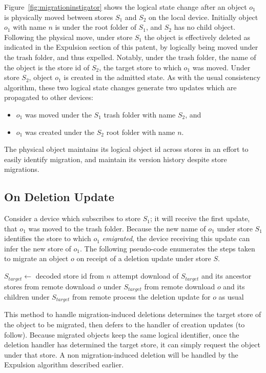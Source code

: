 Figure~\ref{fig:migrationinstigator} shows the logical state change after an
object $o_1$ is physically moved between stores $S_1$ and $S_2$ on the local
device. Initially object $o_1$ with name $n$ is under the root folder of $S_1$,
and $S_2$ has no child object. Following the physical move, under store $S_1$
the object is effectively deleted as indicated in the Expulsion section of this
patent, by logically being moved under the trash folder, and thus expelled.
Notably, under the trash folder, the name of the object is the store id of
$S_2$, the target store to which $o_1$ was moved. Under store $S_2$, object
$o_1$ is created in the admitted state. As with the usual consistency algorithm,
these two logical state changes generate two updates which are propagated to
other devices:
\begin{itemize}
\item $o_1$ was moved under the $S_1$ trash folder with name $S_2$, and
\item $o_1$ was created under the $S_2$ root folder with name $n$.
\end{itemize}
The physical object maintains its logical object id across stores in an effort
to easily identify migration, and maintain its version history despite store
migrations.

\subsection*{On Deletion Update}

Consider a device which subscribes to store $S_1$; it will receive
the first update, that $o_1$ was moved to the trash folder. Because the new name
of $o_1$ under store $S_1$ identifies the store to which $o_1$ {\em emigrated},
the device receiving this update can infer the new store of $o_1$. The following
pseudo-code enumerates the steps taken to migrate an object $o$ on receipt of a
deletion update under store $S$.
\begin{algorithmic}
    \State $S_{target} \gets$ decoded store id from $n$
    \State attempt download of $S_{target}$ and its ancestor stores from remote
        \State \Return
    \EndIf
        \State download $o$ under $S_{target}$ from remote
    \Else
        \State download $o$ and its children under $S_{target}$ from remote
    \EndIf
\Else
    \State process the deletion update for $o$ as usual
\EndIf
\EndFunction
\end{algorithmic}
This method to handle migration-induced deletions determines the target
store of the object to be migrated, then defers to the handler of creation
updates (to follow). Because migrated objects keep the same logical identifier,
once the deletion handler has determined the target store, it can simply request
the object under that store. A non migration-induced deletion will be
handled by the Expulsion algorithm described earlier.

